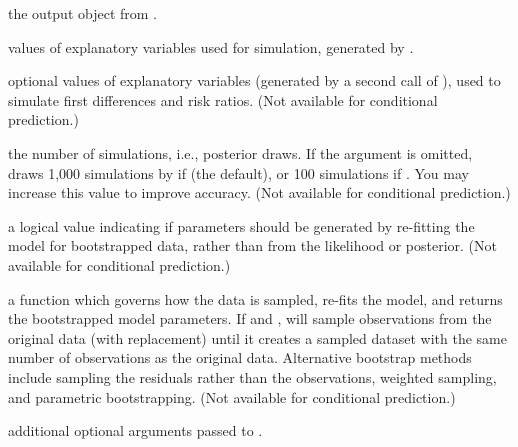 \begin{Arguments}
\begin{ldescription}
\item[\code{object}] the output object from . 
\item[\code{x}] values of explanatory variables used for simulation,
generated by .  
\item[\code{x1}] optional values of explanatory variables (generated by a
second call of ), used to simulate first
differences and risk ratios.  (Not available for conditional
prediction.) 
\item[\code{num}] the number of simulations, i.e., posterior draws.  If the
 argument is omitted,  draws 1,000
simulations by if  (the default), or 100
simulations if .  You may increase this
value to improve accuracy.  (Not available for conditional
prediction.) 
\item[\code{bootstrap}] a logical value indicating if parameters
should be generated by re-fitting the model for bootstrapped
data, rather than from the likelihood or posterior.  (Not
available for conditional prediction.) 
\item[\code{bootfn}] a function which governs how the data is
sampled, re-fits the model, and returns the bootstrapped model
parameters.  If  and ,
 will sample observations from the original data
(with
replacement) until it creates a sampled dataset with the same
number of observations as the original data.  Alternative
bootstrap methods include sampling the residuals rather than the
observations, weighted sampling, and parametric bootstrapping.
(Not available for conditional prediction.) 
\item[\code{...}] additional optional arguments passed to
. 
\end{ldescription}
\end{Arguments}
